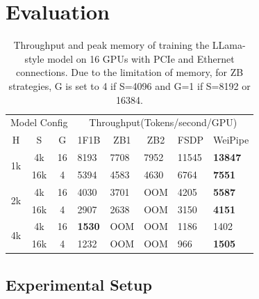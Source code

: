 \documentclass[sigplan,screen]{acmart}
\begin{document}
\section{Evaluation}



\begin{table}[!ht]
\centering
\caption{Throughput and peak memory of training the LLama-style model on 16 GPUs with PCIe and Ethernet connections. Due to the limitation of memory, for ZB strategies, G is set to 4 if S=4096 and G=1 if S=8192 or 16384.}
\begin{tabular}{ccc|lllll}
\hline
\multicolumn{3}{c|}{Model Config}  & \multicolumn{5}{c}{Throughput(Tokens/second/GPU)}                                                                                      \\
H                     & S     & G  & \multicolumn{1}{c}{1F1B} & \multicolumn{1}{c}{ZB1} & \multicolumn{1}{c}{ZB2} & \multicolumn{1}{c}{FSDP} & \multicolumn{1}{c}{WeiPipe} \\ \hline
\multirow{2}{*}{1k} & 4k  & 16 & 8193 & 7708 & 7952 & 11545 & \textbf{13847}              \\
                    & 16k & 4  & 5394 & 4583 & 4630 & 6764 & \textbf{7551 }             \\ \hline
\multirow{2}{*}{2k} & 4k  & 16 & 4030 & 3701 & OOM & 4205 & \textbf{5587 }             \\
                    & 16k & 4  & 2907 & 2638 & OOM & 3150 & \textbf{4151}              \\ \hline
\multirow{2}{*}{4k} & 4k  & 16 & \textbf{1530} & OOM & OOM & 1186 & 1402              \\
                    & 16k & 4  & 1232 & OOM & OOM & 966 & \textbf{1505 }             \\ \hline

\end{tabular}
\label{tab:perform_pcie}
\end{table}

\subsection{Experimental Setup}
\end{document}
